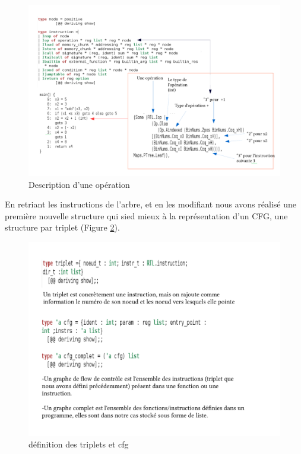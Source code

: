 \begin{figure}

 \includegraphics[width=15cm\textwidth,height=13cm \texteheight]{file_pdf/description_instruction2.pdf}
\caption{\label{fig:5} Description d'une opération }

\end{figure}

En retriant les instructions de l'arbre, et en les modifiant nous avons réalisé une première nouvelle structure qui sied mieux à la représentation d'un CFG, une structure par triplet (Figure \ref{fig:6}).
  
\begin{figure}

 \includegraphics[width=13cm\textwidth,height=8cm \texteheight]{file_pdf/definition_triplet_cfg.pdf}
\caption{\label{fig:6} définition des triplets et cfg }

\end{figure}

